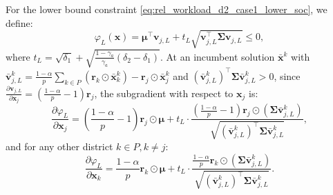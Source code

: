 \documentclass[preprint,12pt,authoryear]{elsarticle}
\begin{document}
For the lower bound constraint \eqref{eq:rel_workload_d2_case1_lower_soc}, we define:
\begin{equation}
\varphi_L(\mathbf{x}) = \boldsymbol{\mu}^\top \mathbf{v}_{j,L} + t_L \sqrt{\mathbf{v}_{j,L}^\top \boldsymbol{\Sigma} \mathbf{v}_{j,L}} \leqslant 0,
\end{equation}
where $t_L = \sqrt{\delta_1} + \sqrt{\frac{1 - \gamma_a}{\gamma_a} (\delta_2 - \delta_1)}$. At an incumbent solution $\bar{\mathbf{x}}^k$ with $\bar{\mathbf{v}}_{j,L}^k = \frac{1-\alpha}{p} \sum_{k \in P} (\mathbf{r}_k \odot \bar{\mathbf{x}}_k^k) - \mathbf{r}_j \odot \bar{\mathbf{x}}_j^k$ and $(\bar{\mathbf{v}}_{j,L}^k)^{\top} \boldsymbol{\Sigma} \bar{\mathbf{v}}_{j,L}^k > 0$, since $\frac{\partial \mathbf{v}_{j,L}}{\partial \mathbf{x}_j} = \left(\frac{1-\alpha}{p} - 1\right) \mathbf{r}_j$, the subgradient with respect to $\mathbf{x}_j$ is:
\begin{equation}
\frac{\partial \varphi_L}{\partial \mathbf{x}_j} = \left(\frac{1-\alpha}{p} - 1\right) \mathbf{r}_j \odot \boldsymbol{\mu} + t_L \cdot \frac{\left(\frac{1-\alpha}{p} - 1\right) \mathbf{r}_j \odot (\boldsymbol{\Sigma} \bar{\mathbf{v}}_{j,L}^k)}{\sqrt{(\bar{\mathbf{v}}_{j,L}^k)^{\top} \boldsymbol{\Sigma} \bar{\mathbf{v}}_{j,L}^k}},
\label{eq:rel_workload_d2_subgradient_L_j}
\end{equation}
and for any other district $k \in P, k \neq j$:
\begin{equation}
\frac{\partial \varphi_L}{\partial \mathbf{x}_k} = \frac{1-\alpha}{p} \mathbf{r}_k \odot \boldsymbol{\mu} + t_L \cdot \frac{\frac{1-\alpha}{p} \mathbf{r}_k \odot (\boldsymbol{\Sigma} \bar{\mathbf{v}}_{j,L}^k)}{\sqrt{(\bar{\mathbf{v}}_{j,L}^k)^{\top} \boldsymbol{\Sigma} \bar{\mathbf{v}}_{j,L}^k}}.
\label{eq:rel_workload_d2_subgradient_L_k}
\end{equation}
\end{document}
